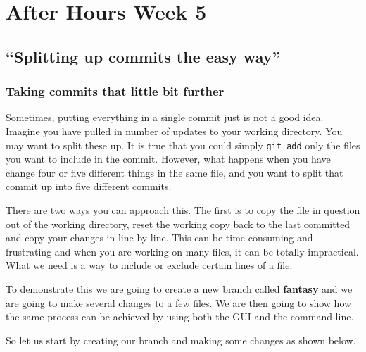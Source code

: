 \chapter{After Hours Week 5}
\section{``Splitting up commits the easy way''}
\subsection{Taking commits that little bit further}

Sometimes, putting everything in a single commit just is not a good idea.  Imagine you have pulled in number of updates to your working directory.  You may want to split these up.  It is true that you could simply \texttt{git add} only the files you want to include in the commit.  However, what happens when you have change four or five different things in the same file, and you want to split that commit up into five different commits.

There are two ways you can approach this.  The first is to copy the file in question out of the working directory, reset the working copy back to the last committed and copy your changes in line by line.  This can be time consuming and frustrating and when you are working on many files, it can be totally impractical.  What we need is a way to include or exclude certain lines of a file.

To demonstrate this we are going to create a new branch called \textbf{fantasy} and we are going to make several changes to a few files.  We are then going to show how the same process can be achieved by using both the GUI and the command line.

So let us start by creating our branch and making some changes as shown below.


